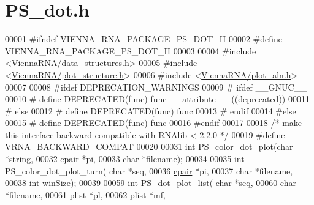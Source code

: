 \hypertarget{PS__dot_8h_source}{\section{P\+S\+\_\+dot.\+h}
\label{PS__dot_8h_source}
}

\begin{DoxyCode}
00001 \textcolor{preprocessor}{#ifndef VIENNA\_RNA\_PACKAGE\_PS\_DOT\_H}
00002 \textcolor{preprocessor}{#define VIENNA\_RNA\_PACKAGE\_PS\_DOT\_H}
00003 
00004 \textcolor{preprocessor}{#include <\hyperlink{data__structures_8h}{ViennaRNA/data\_structures.h}>}
00005 \textcolor{preprocessor}{#include <\hyperlink{plot__structure_8h}{ViennaRNA/plot\_structure.h}>}
00006 \textcolor{preprocessor}{#include <\hyperlink{plot__aln_8h}{ViennaRNA/plot\_aln.h}>}
00007 
00008 \textcolor{preprocessor}{#ifdef DEPRECATION\_WARNINGS}
00009 \textcolor{preprocessor}{# ifdef \_\_GNUC\_\_}
00010 \textcolor{preprocessor}{#  define DEPRECATED(func) func \_\_attribute\_\_ ((deprecated))}
00011 \textcolor{preprocessor}{# else}
00012 \textcolor{preprocessor}{#  define DEPRECATED(func) func}
00013 \textcolor{preprocessor}{# endif}
00014 \textcolor{preprocessor}{#else}
00015 \textcolor{preprocessor}{# define DEPRECATED(func) func}
00016 \textcolor{preprocessor}{#endif}
00017 
00018 \textcolor{comment}{/* make this interface backward compatible with RNAlib < 2.2.0 */}
00019 \textcolor{preprocessor}{#define VRNA\_BACKWARD\_COMPAT}
00020 
00031 \textcolor{keywordtype}{int} PS\_color\_dot\_plot(\textcolor{keywordtype}{char} *\textcolor{keywordtype}{string},
00032                       \hyperlink{group__data__structures_structvrna__cpair__s}{cpair} *pi,
00033                       \textcolor{keywordtype}{char} *filename);
00034 
00035 \textcolor{keywordtype}{int} PS\_color\_dot\_plot\_turn( \textcolor{keywordtype}{char} *seq,
00036                             \hyperlink{group__data__structures_structvrna__cpair__s}{cpair} *pi,
00037                             \textcolor{keywordtype}{char} *filename,
00038                             \textcolor{keywordtype}{int} winSize);
00039 
00059 \textcolor{keywordtype}{int} \hyperlink{group__plotting__utils_ga00ea223b5cf02eb2faae5ff29f0d5e12}{PS\_dot\_plot\_list}( \textcolor{keywordtype}{char} *seq,
00060                       \textcolor{keywordtype}{char} *filename,
00061                       \hyperlink{group__data__structures_structvrna__plist__s}{plist} *pl,
00062                       \hyperlink{group__data__structures_structvrna__plist__s}{plist} *mf,

\end{DoxyCode}

